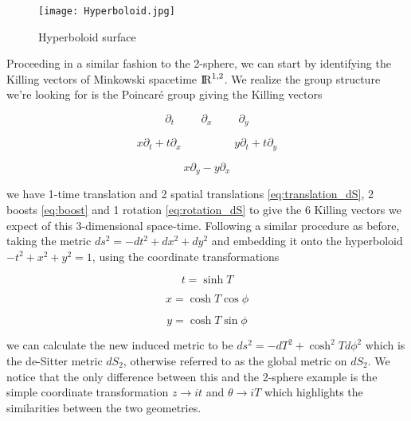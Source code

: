 \documentclass[a4paper,11pt]{article}
\numberwithin{equation}{section}
\numberwithin{figure}{section}
\begin{document}
\begin{large}
\vspace{1.5cm}

\begin{figure}[h]
    \centering
    \texttt{[image: Hyperboloid.jpg]}
    \caption{Hyperboloid surface}
    \label{fig:hyperboloid}
    
\end{figure}

\newpage

Proceeding in a similar fashion to the 2-sphere, we can start by identifying the Killing vectors of Minkowski spacetime ${\rm I\!R}^{1,2}$. We realize the group structure we're looking for is the Poincar\'{e} group giving the Killing vectors

\begin{equation}
\label{eq:translation_dS}
    \partial_t
    \hspace{1cm}
    \partial_x
    \hspace{1cm}
    \partial_y
\end{equation}

\begin{equation}
\label{eq:boost}
    x\partial_t+t\partial_x 
    \hspace{2cm}
    y\partial_t+t\partial_y
\end{equation}

\begin{equation}
\label{eq:rotation_dS}
    x\partial_y-y\partial_x 
\end{equation}

we have 1-time translation and 2 spatial translations \eqref{eq:translation_dS}, 2 boosts \eqref{eq:boost} and 1 rotation \eqref{eq:rotation_dS} to give the 6 Killing vectors we expect of this 3-dimensional space-time. Following a similar procedure as before, taking the metric $ds^2=-dt^2+dx^2+dy^2$ and embedding it onto the hyperboloid $-t^2+x^2+y^2=1$, using the coordinate transformations

\begin{equation}
\label{eq:t_hyp}
    t=\sinh T 
\end{equation}

\begin{equation}
\label{eq:x_hyp}
    x=\cosh T\cos\phi
\end{equation}

\begin{equation}
\label{eq:y_hyp}
    y=\cosh T\sin\phi
\end{equation}

we can calculate the new induced metric to be $ds^2=-dT^2+\cosh^2T d\phi^2$ which is the de-Sitter metric $dS_2$, otherwise referred to as the global metric on $dS_2$. We notice that the only difference between this and the 2-sphere example is the simple coordinate transformation $z \rightarrow it$ and $\theta \rightarrow iT$ which highlights the similarities between the two geometries.


\end{large}
\end{document}
